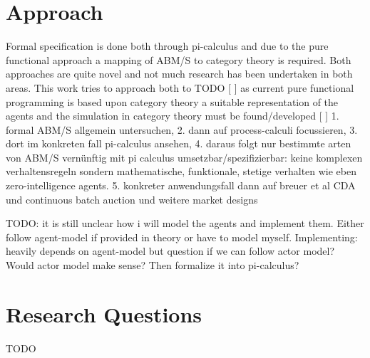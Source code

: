 \documentclass{article}
\begin{document}

\section{Approach}
Formal specification is done both through pi-calculus and due to the pure functional approach a mapping of ABM/S to category theory is required. Both approaches are quite novel and not much research has been undertaken in both areas. This work tries to approach both to  TODO
[ ] as current pure functional programming is based upon category theory a suitable representation of the agents and the simulation in category theory must be found/developed
[ ] 1. formal ABM/S allgemein untersuchen, 2. dann auf process-calculi focussieren, 3. dort im konkreten fall pi-calculus ansehen, 4. daraus folgt nur bestimmte arten von ABM/S vernünftig mit pi calculus umsetzbar/spezifizierbar: keine komplexen verhaltensregeln sondern mathematische, funktionale, stetige verhalten wie eben zero-intelligence agents. 5. konkreter anwendungsfall dann auf breuer et al CDA und continuous batch auction und weitere market designs

TODO: it is still unclear how i will model the agents and implement them. Either follow agent-model if provided in theory or have to model myself. Implementing: heavily depends on agent-model but question if we can follow actor model? Would actor model make sense? Then formalize it into pi-calculus?



\section{Research Questions}
TODO






\end{document}
